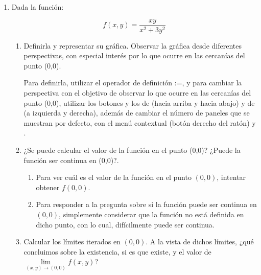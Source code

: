 \begin{enumerate}[leftmargin=*]
\begin{enumerate}
\begin{indication}
{}
\end{indication}

\end{enumerate}

\item Dada la función:


\[
f(x,y) = \frac{{xy}} {{x^2  + 3y^2 }}
\]

\begin{enumerate}
  \item Definirla y representar su gráfica. Observar
  la gráfica desde diferentes perspectivas,
  con especial interés por lo que ocurre en las
  cercanías del punto (0,0).

\begin{indication}
{Para definirla, utilizar el operador de definición :=, y para
cambiar la perspectiva con el objetivo de observar lo que ocurre en
las cercanías del punto (0,0), utilizar los botones
 y los de  (hacia arriba y hacia
abajo) y de  (a izquierda y derecha), además de cambiar
el número de paneles que se muestran por defecto, con el menú
contextual (botón derecho del ratón) y .

}
\end{indication}

  \item ¿Se puede calcular el valor de la función en el punto
  (0,0)? ¿Puede la función ser continua en (0,0)?.

\begin{indication}
{

\begin{enumerate}

\item Para ver cuál es el valor de la función en el punto $(0,0)$,
intentar obtener $f(0,0)$.

\item Para responder a la pregunta sobre si la función puede ser
continua en $(0,0)$, simplemente considerar que la función no está
definida en dicho punto, con lo cual, difícilmente puede ser
continua.

\end{enumerate}

}
\end{indication}


  \item Calcular los límites iterados en $(0,0)$. A la vista de
  dichos límites, ¿qué concluimos sobre la existencia, si es que existe, y el valor
  de $\mathop {\lim }\limits_{\left( {x,y} \right) \to \left( {0,0}
  \right)} f\left( {x,y} \right)$?


\end{enumerate}
\end{enumerate}
